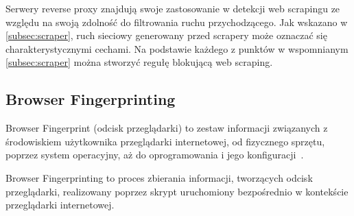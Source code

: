 Serwery reverse proxy znajdują swoje zastosowanie w detekcji web scrapingu ze względu na swoją zdolność do filtrowania ruchu przychodzącego.
Jak wskazano w \autoref{subsec:scraper}, ruch sieciowy generowany przed scrapery może oznaczać się charakterystycznymi cechami.
Na podstawie każdego z punktów w wspomnianym \autoref{subsec:scraper} można stworzyć regułę blokującą web scraping.

\newpage

\subsection{Browser Fingerprinting}\label{subsec:browser-fingerprinting}

Browser Fingerprint (odcisk przeglądarki) to zestaw informacji związanych z środowiskiem użytkownika przeglądarki internetowej, od fizycznego sprzętu, poprzez system operacyjny, aż do oprogramowania i jego konfiguracji~\cite{browser-fingerprinting-a-survey}.

Browser Fingerprinting to proces zbierania informacji, tworzących odcisk przeglądarki, realizowany poprzez skrypt uruchomiony bezpośrednio w kontekście przeglądarki internetowej.

